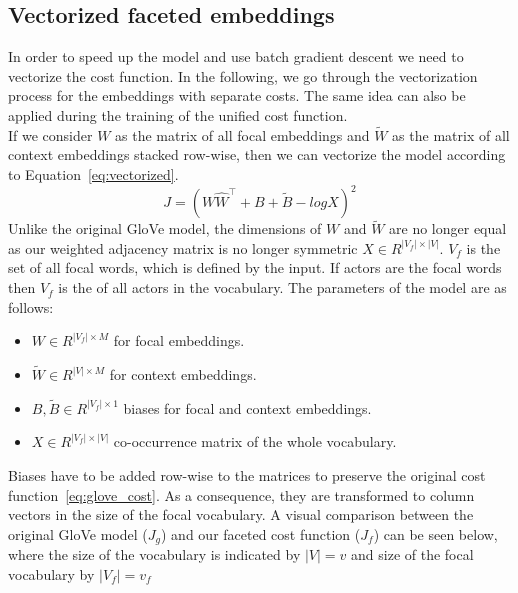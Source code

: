 \subsection{Vectorized faceted embeddings}
In order to speed up the model and use batch gradient descent we need to vectorize the cost function. In the following, we go through the vectorization process for the embeddings with separate costs. The same idea can also be applied during the training of the unified cost function.\\
If we consider $W$ as the matrix of all focal embeddings and $\tilde{ W }$ as the matrix of all context embeddings stacked row-wise, then we can vectorize the model according to Equation~\ref{eq:vectorized}. 
\begin{equation}
J=(W \hat{  W }^{ \top } +B+\tilde{ B } -log{ X })^{ 2 }
\label{eq:vectorized}
\end{equation}
Unlike the original GloVe model, the dimensions of  $W$ and $\tilde{ W } $ are no longer equal as our weighted adjacency matrix is no longer symmetric $X \in R^{|V_f|\times |V|} $.  $V_f$ is the set of all focal words, which is defined by the input. If actors are the focal words then $V_f$ is the  of all actors in the vocabulary. The parameters of the model are as follows: 
\begin{itemize}
\item $W \in R^{|V_f| \times M} $ for focal embeddings.
 \item $\tilde{ W }  \in R^{|V| \times M} $ for context embeddings.
\item $B,\tilde{B} \in R^{|V_f| \times 1}$ biases for focal and context embeddings.
\item $X \in R^{|V_f|\times |V|} $ co-occurrence matrix of the whole vocabulary. 
\end{itemize}
Biases have to be added row-wise to the matrices to preserve the original cost function~\ref{eq:glove_cost}. As a consequence, they are transformed to column vectors in the size of the focal vocabulary. A visual comparison between the original GloVe model ($J_g$) and our faceted cost function ($J_f$) can be seen below, where the size of the vocabulary is indicated by $|V|=v$ and size of the focal vocabulary by $|V_f|=v_f$\\
